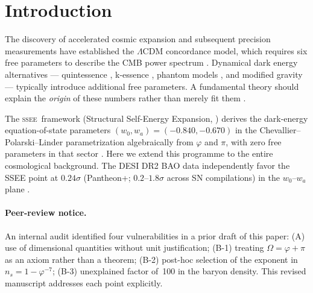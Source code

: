 \documentclass[12pt,a4paper]{article}
\newcommand{\SSEE}{\ifmmode\mathrm{SSEE}\else\textsc{ssee}\fi}
\begin{document}
\clearpage
{\small\tableofcontents}
\clearpage

\section{Introduction}

The discovery of accelerated cosmic expansion
\citep{Riess1998,Perlmutter1999} and subsequent precision measurements
\citep{PlanckCollaboration2020a} have established the $\Lambda$CDM concordance
model, which requires six free parameters to describe the CMB power spectrum
\citep{Hu1997}.
Dynamical dark energy alternatives — quintessence \citep{Ratra1988,Copeland2006,Steinhardt1997,Zlatev1999},
k-essence \citep{ArmendarizPicon2001}, phantom models \citep{Caldwell2002},
and modified gravity \citep{Clifton2012} —
typically introduce additional free parameters.
A fundamental theory should explain the \emph{origin} of these numbers rather than
merely fit them \citep{Weinberg1987,Weinberg2013review}.

The \SSEE\ framework (Structural Self-Energy Expansion, \citep{AlmeidaSSEE2026genesis})
derives the dark-energy equation-of-state parameters
$(w_0, w_a) = (-0.840, -0.670)$ in the Chevallier--Polarski--Linder
parametrization \citep{ChevallierPolarski2001,Linder2003}
algebraically from $\varphi$ and $\pi$, with zero free parameters in that
sector \citep{AlmeidaSSEE2026paper1,AlmeidaSSEE2026paper2,AlmeidaSSEE2026paper3}.
Here we extend this programme to the entire cosmological background.
The DESI DR2 BAO data \citep{desidr2_2025} independently favor the
SSEE point at $0.24\sigma$ (Pantheon+; $0.2$--$1.8\sigma$ across SN compilations) in the $w_0$--$w_a$ plane \citep{AlmeidaSSEE2026paper2}.

\paragraph{Peer-review notice.}
An internal audit identified four vulnerabilities in a prior draft of this paper:
(A) use of dimensional quantities without unit justification;
(B-1) treating $\Omega = \varphi+\pi$ as an axiom rather than a theorem;
(B-2) post-hoc selection of the exponent in $n_s = 1-\varphi^{-7}$;
(B-3) unexplained factor of~100 in the baryon density.
This revised manuscript addresses each point explicitly.

\end{document}
